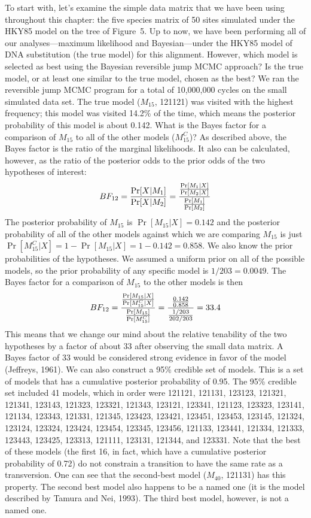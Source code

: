\documentclass{svmult}
\begin{document}
To start with, let's examine the simple data matrix
that we have been using throughout this chapter: the five species matrix of 50 sites simulated under the HKY85 model on the tree of Figure~5. Up to now, we have been
performing all of our analyses---maximum likelihood and Bayesian---under the HKY85 model of DNA substitution (the true model) for this alignment. However, which model is selected
as best using the Bayesian reversible jump MCMC approach? Is the true model, or at least one similar to the true model, chosen as the best?
We ran the reversible jump MCMC program for a total of 10,000,000 cycles on the small simulated data set. The true model
($M_{15}$, 121121) was visited with the highest frequency; this model was visited 14.2\% of the time, which means the posterior probability of this model is about
0.142. What is the Bayes factor for a comparison of $M_{15}$ to all of the other models ($M_{15}^C$)? As described above, the Bayes factor is the ratio of the marginal
likelihoods. It also can be calculated, however, as the ratio of the posterior odds to the prior odds of the two hypotheses of interest:
$$
BF_{12} = {\Pr[X | M_1] \over \Pr[X | M_2]} = { {\Pr[M_1 | X] \over \Pr[M_2 | X]} \over {\Pr[M_1] \over \Pr[M_2]} }
$$
The posterior probability of $M_{15}$ is $\Pr[M_{15} | X] = 0.142$ and the posterior probability of all of the other models against which we are comparing $M_{15}$ is
just $\Pr[M_{15}^C | X] = 1 - \Pr[M_{15} | X]  = 1 - 0.142 = 0.858$. We also know the prior probabilities of the hypotheses. We assumed a uniform prior on all of the possible
models, so the prior probability of any specific model is $1 / 203 = 0.0049$. The Bayes factor for a comparison of $M_{15}$ to the other models is then
$$
BF_{12} = { {\Pr[M_{15} | X] \over \Pr[M_{15}^C | X]} \over {\Pr[M_{15}] \over \Pr[M_{15}^C]} } = 
{ {0.142 \over 0.858} \over {1/203 \over 202/203} } = 33.4
$$
This means that we change our mind about the relative tenability of the two hypotheses by a factor of about 33 after observing the small data matrix. A Bayes factor of 33 would
be considered strong evidence in favor of the model (Jeffreys, 1961). We can also construct a 95\% credible set of models. This is a set of models that has a cumulative
posterior probability of 0.95. The 95\% credible set included 41 models, which in order were
121121, 121131, 123123, 121321, 121341, 123143, 121323, 123321, 121343, 123121, 
123341, 121123, 123323, 123141, 121134, 123343, 121331, 121345, 123423, 123421, 
123451, 123453, 123145, 121324, 123124, 123324, 123424, 123454, 123345, 123456, 
121133, 123441, 121334, 121333, 123443, 123425, 123313, 121111, 123131, 121344, 
and 123331. Note that the best of these models (the first 16, in fact, which have a cumulative posterior probability of 0.72) do not constrain a transition to have the same
rate as a transversion. One can see that the second-best model ($M_{40}$, 121131) has this property. The second best model also happens to be a named one
(it is the model described by Tamura and Nei, 1993). The third best model, however, is not a named one.
\end{document}
